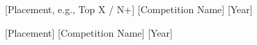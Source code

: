 

\begin{cvhonors}

  \cvhonor
    {[Placement, e.g., Top X / N+]} %
    {[Competition Name]} %
    {} %
    {[Year]} %

  \cvhonor
    {[Placement]} %
    {[Competition Name]} %
    {} %
    {[Year]} %

\end{cvhonors}
